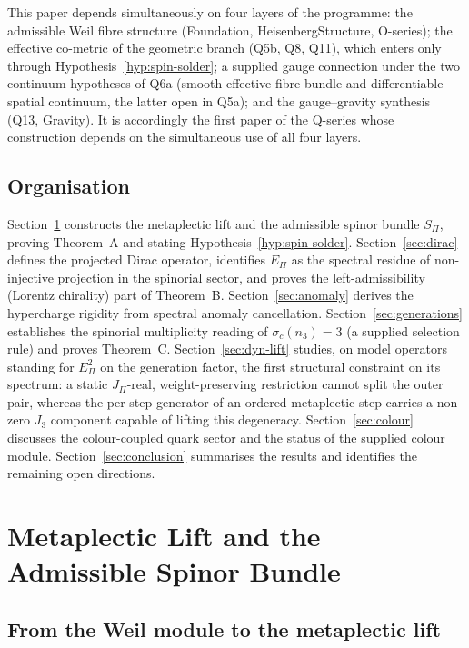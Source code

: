 \documentclass[11pt,a4paper]{article}
\theoremstyle{definition}
\theoremstyle{remark}
\begin{document}
    This paper depends simultaneously on four layers of the programme: the admissible
    Weil fibre structure (Foundation, HeisenbergStructure, O-series); the effective co-metric
    of the geometric branch (Q5b, Q8, Q11), which enters only through
    Hypothesis~\ref{hyp:spin-solder}; a supplied gauge connection under the two continuum
    hypotheses of Q6a (smooth effective fibre bundle and differentiable spatial continuum, the latter
    open in Q5a); and the
    gauge--gravity synthesis (Q13, Gravity).
    It is accordingly the first paper of the Q-series whose construction depends on
    the simultaneous use of all four layers.

  \subsection{Organisation}
    \label{ssec:organisation}

    Section~\ref{sec:metaplectic} constructs the metaplectic lift and the admissible
    spinor bundle $S_\Pi$, proving Theorem~A and stating Hypothesis~\ref{hyp:spin-solder}.
    Section~\ref{sec:dirac} defines the projected Dirac operator, identifies $E_\Pi$
    as the spectral residue of non-injective projection in the spinorial sector, and
    proves the left-admissibility (Lorentz chirality) part of Theorem~B.
    Section~\ref{sec:anomaly} derives the hypercharge rigidity from spectral anomaly
    cancellation.
    Section~\ref{sec:generations} establishes the spinorial multiplicity reading of
    $\sigma_c(n_3) = 3$ (a supplied selection rule) and proves Theorem~C.
    Section~\ref{sec:dyn-lift} studies, on model operators standing for $E_\Pi^2$ on the generation
    factor, the first structural constraint on its spectrum: a static $J_\Pi$-real, weight-preserving restriction
    cannot split the outer pair, whereas the per-step generator of an ordered metaplectic step
    carries a non-zero $J_3$ component capable of lifting this degeneracy.
    Section~\ref{sec:colour} discusses the colour-coupled quark sector and the status of the
    supplied colour module.
    Section~\ref{sec:conclusion} summarises the results and identifies the remaining
    open directions.

    \newpage
  \section{Metaplectic Lift and the Admissible Spinor Bundle}
  \label{sec:metaplectic}

  \subsection{From the Weil module to the metaplectic lift}
    \label{ssec:weil-metaplectic}
\end{document}

